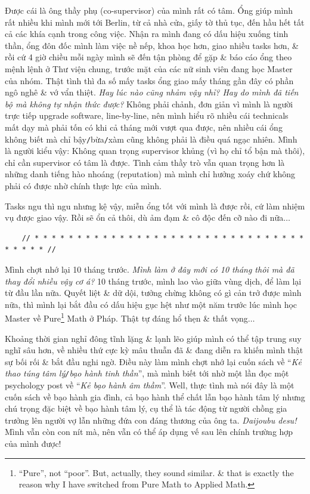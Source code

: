 \documentclass[12pt]{article}
\begin{document}
Được cái là ông thầy phụ (co-supervisor) của mình rất có tâm. Ổng giúp mình rất nhiều khi mình mới tới Berlin, từ cả nhà cửa, giấy tờ thủ tục, đến hầu hết tất cả các khía cạnh trong công việc. Nhận ra mình đang có dấu hiệu xuống tinh thần, ổng đôn đốc mình làm việc nề nếp, khoa học hơn, giao nhiều tasks hơn, \& rồi cứ 4 giờ chiều mỗi ngày mình sẽ đến tận phòng để gặp \& báo cáo ổng theo mệnh lệnh ở Thư viện chung, trước mặt của các nữ sinh viên đang học Master của nhóm. Thật tình thì đa số mấy tasks ổng giao mấy tháng gần đây có phần ngô nghê \& vớ vẩn thiệt. {\it Hay lúc nào cũng nhảm vậy nhỉ? Hay do mình đã tiến bộ mà không tự nhận thức được?} Không phải chảnh, đơn giản vì mình là người trực tiếp upgrade software, line-by-line, nên mình hiểu rõ nhiều cái technicals mất dạy mà phải tốn có khi cả tháng mới vượt qua được, nên nhiều cái ổng không biết mà chỉ bậy{\tt/}bừa{\tt/}xàm cũng không phải là điều quá ngạc nhiên. Mình là người kiểu vậy: Không quan trọng supervisor khủng (vì họ chỉ tổ bận mà thôi), chỉ cần supervisor có tâm là được. Tình cảm thầy trò vẫn quan trọng hơn là những danh tiếng hào nhoáng (reputation) mà mình chỉ hưởng xoáy chứ không phải có được nhờ chính thực lực của mình.

Tasks ngu thì ngu nhưng kệ vậy, miễn ổng tốt với mình là được rồi, cứ làm nhiệm vụ được giao vậy. Rồi sẽ ổn cả thôi, dù ảm đạm \& cô độc đến cỡ nào đi nữa$\ldots$

\begin{verbatim}
	// * * * * * * * * * * * * * * * * * * * * * * * * * * * * * * * * * * * * * //
\end{verbatim}

\noindent
{} Mình chợt nhớ lại 10 tháng trước. {\it Mình làm ở đây mới có 10 tháng thôi mà đã thay đổi nhiều vậy cơ á?} 10 tháng trước, mình lao vào giữa vùng dịch, để làm lại từ đầu lần nữa. Quyết liệt \& dữ dội, tưởng chừng không có gì cản trở được mình nữa, thì mình lại bắt đầu có dấu hiệu gục hệt như một năm trước lúc mình học Master về Pure\footnote{``Pure'', not ``poor''. But, actually, they sound similar. \& that is exactly the reason why I have switched from Pure Math to Applied Math.} Math ở Pháp. Thật tự đáng hổ thẹn \& thất vọng$\ldots$

Khoảng thời gian nghỉ đông tĩnh lặng \& lạnh lẽo giúp mình có thể tập trung suy nghĩ sâu hơn, về nhiều thứ cực kỳ mâu thuẫn đã \& đang diễn ra khiến mình thật sự bối rối \& bắt đầu nghi ngờ. Điều này làm mình chợt nhớ lại cuốn sách \cite{Bancroft2003} về ``{\it Kẻ thao túng tâm lý{\tt/}bạo hành tinh thần}'', mà mình biết tới nhờ một lần đọc một psychology post về ``{\it Kẻ bạo hành âm thầm}''. Well, thực tình mà nói đây là một cuốn sách về bạo hành gia đình, cả bạo hành thể chất lẫn bạo hành tâm lý nhưng chú trọng đặc biệt về bạo hành tâm lý, cụ thể là tác động từ người chồng gia trưởng lên người vợ lẫn những đứa con đáng thương của ông ta. {\it Daijoubu desu!} Mình vẫn còn con nít mà, nên vẫn có thể áp dụng vế sau lên chính trường hợp của mình được!
\end{document}
